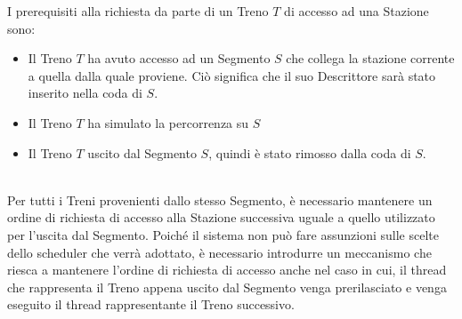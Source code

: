 		I prerequisiti alla richiesta da parte di un Treno $T$ di accesso ad una Stazione sono:
		
			\begin{itemize}
				\item Il Treno $T$ ha avuto accesso ad un Segmento $S$ che collega la stazione corrente a quella dalla quale proviene. Ciò significa che il suo Descrittore sarà stato inserito nella coda  di $ S $.
				\item Il Treno $T$ ha simulato la percorrenza su $S$ 
				\item Il Treno $T$ uscito dal Segmento $S$, quindi è stato rimosso dalla coda  di $S$.
			\end{itemize}
			
		\begin{description}
			
			\item{}\\
		
		Per tutti i Treni provenienti dallo stesso Segmento, è necessario mantenere un ordine di richiesta di accesso alla Stazione successiva uguale a quello utilizzato per l'uscita dal Segmento. Poiché il sistema non può fare assunzioni sulle scelte dello scheduler che verrà adottato, è necessario introdurre un meccanismo che riesca a mantenere l'ordine di richiesta di accesso anche nel caso in cui, il thread che rappresenta il Treno appena uscito dal Segmento venga prerilasciato e venga eseguito il thread rappresentante il Treno successivo.


\end{description}
